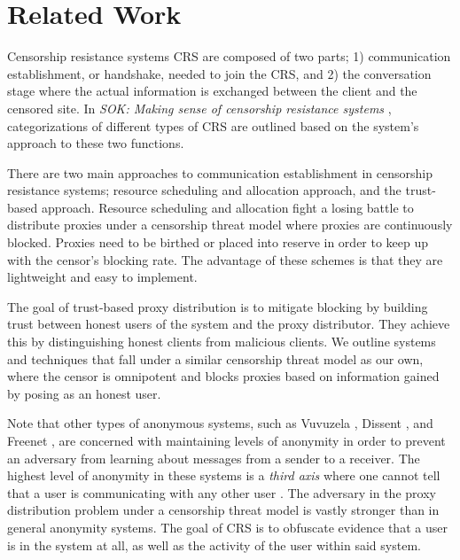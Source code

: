 
\chapter{Related Work} 
\label{sec:related}


Censorship resistance systems \ac{CRS} are composed of two parts; 1) communication establishment, or handshake, needed to join the \ac{CRS}, and 2) the conversation stage where the actual information is exchanged between the client and the censored site. In \textit{SOK: Making sense of censorship resistance systems} \cite{khattak2016sok}, categorizations of different types of \ac{CRS} are outlined based on the system's approach to these two functions. 

There are two main approaches to communication establishment in censorship resistance systems; resource scheduling and allocation approach, and the trust-based approach. Resource scheduling and allocation fight a losing battle to distribute proxies under a censorship threat model where proxies are continuously blocked. Proxies need to be birthed or placed into reserve in order to keep up with the censor's blocking rate. The advantage of these schemes is that they are lightweight and easy to implement.

The goal of trust-based proxy distribution is to mitigate blocking by building trust between honest users of the system and the proxy distributor. They achieve this by distinguishing honest clients from malicious clients. We outline systems and techniques that fall under a similar censorship threat model as our own, where the censor is omnipotent and blocks proxies based on information gained by posing as an honest user.

Note that other types of anonymous systems, such as Vuvuzela \cite{vandenHooff:2015:VSP:2815400.2815417}, Dissent \cite{corrigan2010dissent}, and Freenet \cite{clarke2001freenet}, are concerned with maintaining levels of anonymity in order to prevent an adversary from learning about messages from a sender to a receiver. The highest level of anonymity in these systems is a \textit{third axis} where one cannot tell that a user is communicating with any other user \cite{reiter1999anonymous}. The adversary in the proxy distribution problem under a censorship threat model is vastly stronger than in general anonymity systems. The goal of \ac{CRS} is to obfuscate evidence that a user is in the system at all, as well as the activity of the user within said system.

